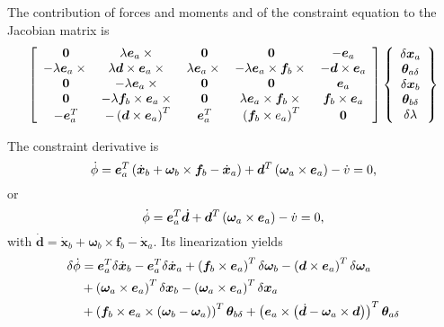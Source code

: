 \documentclass[10pt,dvips,fleqn,subeqn]{report}
\newcommand{\T}[1]{\bm{#1}}
\begin{document}
The contribution of forces and moments and of the constraint equation 
to the Jacobian matrix is
\begin{equation}
	\sqbr{\matr{ccccc}{
		\T{0} & \lambda \T{e}_a \times{} & \T{0} & \T{0} & - \T{e}_a \\
		- \lambda \T{e}_a \times{} & \lambda \T{d}\times\T{e}_a\times{} & 
			\lambda \T{e}_a \times{} & - \lambda \T{e}_a \times \T{f}_b\times{} &
			- \T{d}\times\T{e}_a \\
		\T{0} & - \lambda \T{e}_a \times{} & \T{0} & \T{0} & \T{e}_a \\
		\T{0} & - \lambda \T{f}_b \times \T{e}_a \times{} &
			\T{0} & \lambda \T{e}_a\times\T{f}_b\times{} & \T{f}_b\times\T{e}_a \\
		- \T{e}_a^T & - \plbr{\T{d} \times \T{e}_a}^T &
			\T{e}_a^T & \plbr{\T{f}_b\times{e}_a}^T & \T{0}
	}}\cubr{\cvvect{
		\delta\T{x}_a \\
		\T{\theta}_{a\delta} \\
		\delta\T{x}_b \\
		\T{\theta}_{b\delta} \\
		\delta\lambda
	}}
\end{equation}

The constraint derivative is
\begin{equation}
	\dot{\phi} = \T{e}_a^T\plbr{
		\dot{\T{x}}_b
		+ \T{\omega}_b \times \T{f}_b
		- \dot{\T{x}}_a
	} + \T{d}^T \plbr{\T{\omega}_a \times \T{e}_a} - \dot{v} = 0 ,
\end{equation}
or
\begin{equation}
	\dot{\phi} = \T{e}_a^T \dot{\T{d}}
	+ \T{d}^T \plbr{\T{\omega}_a \times \T{e}_a} - \dot{v} = 0 ,
\end{equation}
with $\dot{\T{d}}=\dot{\T{x}}_b+\T{\omega}_b\times\T{f}_b-\dot{\T{x}}_a$.
Its linearization yields
\begin{align}
	\delta\dot{\phi} &= \T{e}_a^T \delta\dot{\T{x}}_b
	- \T{e}_a^T \delta\dot{\T{x}}_a
	+ \plbr{\T{f}_b \times \T{e}_a}^T \delta\T{\omega}_b
	- \plbr{\T{d} \times \T{e}_a}^T \delta\T{\omega}_a \nonumber \\
	& + \plbr{\T{\omega}_a \times \T{e}_a}^T \delta\T{x}_b
	- \plbr{\T{\omega}_a \times \T{e}_a}^T \delta\T{x}_a \nonumber \\
	& + \plbr{\T{f}_b \times \T{e}_a \times \plbr{\T{\omega}_b - \T{\omega}_a}}^T \T{\theta}_{b\delta}
	+ \plbr{\T{e}_a \times \plbr{\dot{\T{d}} - \T{\omega}_a \times \T{d}}}^T \T{\theta}_{a\delta}
\end{align}
\end{document}
